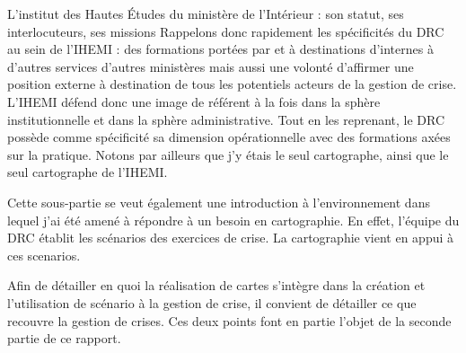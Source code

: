 \documentclass[10pt,a4paper]{report} %
\begin{document}
\begin{part}{L’institut des Hautes Études du ministère de l’Intérieur : son statut, ses interlocuteurs, ses missions}
Rappelons donc rapidement les spécificités du DRC au sein de l’IHEMI : des formations portées par et à destinations d’internes à d’autres services d’autres ministères mais aussi une volonté d’affirmer une position externe à destination de tous les potentiels acteurs de la gestion de crise. L’IHEMI défend donc une image de référent à la fois dans la sphère institutionnelle et dans la sphère administrative. Tout en les reprenant, le DRC possède comme spécificité sa dimension opérationnelle avec des formations axées sur la pratique. Notons par ailleurs que j’y étais le seul cartographe, ainsi que le seul cartographe de l’IHEMI.

Cette sous-partie se veut également une introduction à l’environnement dans lequel j’ai été amené à répondre à un besoin en cartographie. En effet, l’équipe du DRC établit les scénarios des exercices de crise. La cartographie vient en appui à ces scenarios. 

Afin de détailler en quoi la réalisation de cartes s’intègre dans la création et l’utilisation de scénario à la gestion de crise, il convient de détailler ce que recouvre la gestion de crises. Ces deux points font en partie l’objet de la seconde partie de ce rapport.


\end{part}

\newpage
\thispagestyle{empty}
\mbox{}
\newpage

\end{document}
